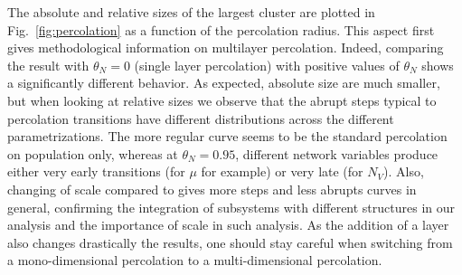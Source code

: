 \documentclass{article}
\begin{document}
The absolute and relative sizes of the largest cluster are plotted in Fig.~\ref{fig:percolation} as a function of the percolation radius. This aspect first gives methodological information on multilayer percolation. Indeed, comparing the result with $\theta_N = 0$ (single layer percolation) with positive values of $\theta_N$ shows a significantly different behavior. As expected, absolute size are much smaller, but when looking at relative sizes we observe that the abrupt steps typical to percolation transitions have different distributions across the different parametrizations. The more regular curve seems to be the standard percolation on population only, whereas at $\theta_N = 0.95$, different network variables produce either very early transitions (for $\mu$ for example) or very late (for $N_V$). Also, changing of scale compared to \cite{arcaute2016cities} gives more steps and less abrupts curves in general, confirming the integration of subsystems with different structures in our analysis and the importance of scale in such analysis. As the addition of a layer also changes drastically the results, one should stay careful when switching from a mono-dimensional percolation to a multi-dimensional percolation.



\end{document}
